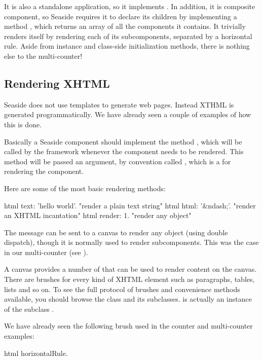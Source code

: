 \documentclass[a4paper,10pt,twoside]{book}
\begin{document}
It is also a standalone application, so it implements .
In addition, it is composite component, so Seaside requires it to declare its children by implementing a method , which returns an array of all the components it contains.
It trivially renders itself by rendering each of its subcomponents, separated by a horizontal rule.
Aside from instance and class-side initialization methods, there is nothing else to the multi-counter!

\subsection{Rendering XHTML}

Seaside does not use templates to generate web pages.
Instead XTHML is generated programmatically.
We have already seen a couple of examples of how this is done.

Basically a Seaside component should implement the method , which will be called by the framework whenever the component needs to be rendered.
This method will be passed an argument, by convention called , which is a  for rendering the component.

Here are some of the most basic rendering methods:
\begin{code}{}
html text: 'hello world'.  "render a plain text string"
html html: '&ndash;'.     "render an XHTML incantation"
html render: 1.              "render any object"
\end{code}

The message  can be sent to a canvas to render any object (using double dispatch), though it is normally used to render subcomponents.
This was the case in our multi-counter (see ).

A canvas provides a number of  that can be used to render content on the canvas.
There are brushes for every kind of XHTML element such as paragraphs, tables, lists and so on.
To see the full protocol of brushes and convenience methods available, you should browse the class  and its subclasses.
 is actually an instance of the subclass .

We have already seen the following brush used in the counter and multi-counter examples:
\begin{code}{}
html horizontalRule.
\end{code}
\end{document}
